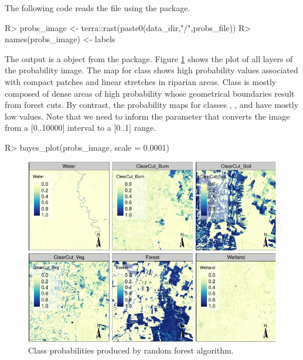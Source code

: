 \documentclass[
  shortnames]{jss}
\begin{document}
The following code reads the file using the  package.

\begin{CodeChunk}
\begin{CodeInput}
R> probs_image <- terra::rast(paste0(data_dir,"/",probs_file))
R> names(probs_image) <- labels
\end{CodeInput}
\end{CodeChunk}

The output is a  object from the  package. Figure \ref{fig:pcube} shows the plot of all layers of the probability image. The map for class  shows high probability values associated with compact patches and linear stretches in riparian areas. Class  is mostly composed of dense areas of high probability whose geometrical boundaries result from forest cuts. By contrast, the probability maps for classes , , and  have mostly low values. Note that we need to inform the  parameter that converts the image from a {[}0..10000{]} interval to a {[}0..1{]} range.

\begin{CodeChunk}
\begin{CodeInput}
R> bayes_plot(probs_image, scale = 0.0001)
\end{CodeInput}
\begin{figure}[h]

{\centering \includegraphics{Bayesian_smoothing_JSS_files/figure-latex/pcube-1} 

}

\caption[Class probabilities produced by random forest algorithm]{Class probabilities produced by random forest algorithm.}\label{fig:pcube}
\end{figure}
\end{CodeChunk}
\end{document}
